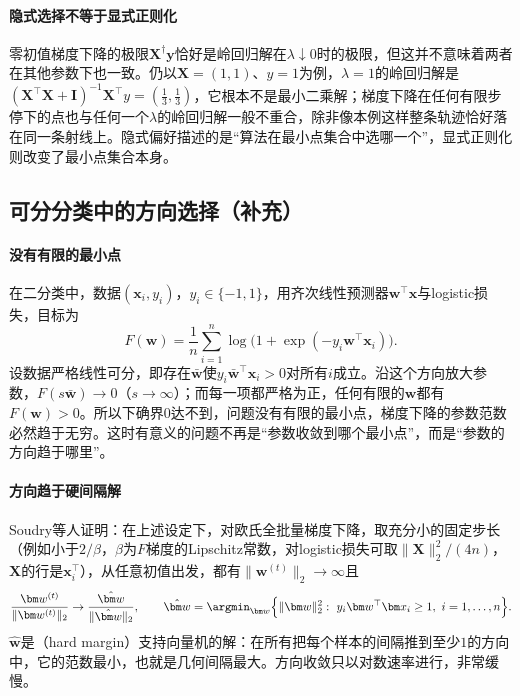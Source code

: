 \paragraph{隐式选择不等于显式正则化}
零初值梯度下降的极限$\bm X^\dagger\bm y$恰好是岭回归解在$\lambda\downarrow0$时的极限，但这并不意味着两者在其他参数下也一致。仍以$\bm X=(1,1)$、$y=1$为例，$\lambda=1$的岭回归解是$(\bm X^\top\bm X+\bm I)^{-1}\bm X^\top y=(\tfrac13,\tfrac13)$，它根本不是最小二乘解；梯度下降在任何有限步停下的点也与任何一个$\lambda$的岭回归解一般不重合，除非像本例这样整条轨迹恰好落在同一条射线上。隐式偏好描述的是“算法在最小点集合中选哪一个”，显式正则化则改变了最小点集合本身。

\subsection{可分分类中的方向选择（补充）}
\label{sec:opt-fit-separable}

\paragraph{没有有限的最小点}
在二分类中，数据$(\bm x_i,y_i)$，$y_i\in\{-1,1\}$，用齐次线性预测器$\bm w^\top\bm x$与logistic损失，目标为
\[
  F(\bm w)=\frac1n\sum_{i=1}^n\log\bigl(1+\exp(-y_i\bm w^\top\bm x_i)\bigr).
\]
设数据严格线性可分，即存在$\bar{\bm w}$使$y_i\bar{\bm w}^\top\bm x_i>0$对所有$i$成立。沿这个方向放大参数，$F(s\bar{\bm w})\to0$（$s\to\infty$）；而每一项都严格为正，任何有限的$\bm w$都有$F(\bm w)>0$。所以下确界$0$达不到，问题没有有限的最小点，梯度下降的参数范数必然趋于无穷。这时有意义的问题不再是“参数收敛到哪个最小点”，而是“参数的方向趋于哪里”。

\paragraph{方向趋于硬间隔解}
Soudry等人证明：在上述设定下，对欧氏全批量梯度下降，取充分小的固定步长（例如小于$2/\beta$，$\beta$为$F$梯度的Lipschitz常数，对logistic损失可取$\|\bm X\|_2^2/(4n)$，$\bm X$的行是$\bm x_i^\top$），从任意初值出发，都有$\|\bm w^{(t)}\|_2\to\infty$且
\[
  \frac{\bm w^{(t)}}{\|\bm w^{(t)}\|_2}\to\frac{\hat{\bm w}}{\|\hat{\bm w}\|_2},\qquad
  \hat{\bm w}=\argmin_{\bm w}\Bigl\{\|\bm w\|_2^2:\ y_i\bm w^\top\bm x_i\ge1,\ i=1,\dots,n\Bigr\}.
\]
$\hat{\bm w}$是（hard margin）支持向量机的解：在所有把每个样本的间隔推到至少$1$的方向中，它的范数最小，也就是几何间隔最大。方向收敛只以对数速率进行，非常缓慢。

